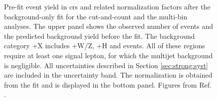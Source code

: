 \begin{figure}[htbp]
	\centering
	\caption{Pre-fit event yield in \glspl{cr} and related \ttbar
          normalization factors after the background-only fit for
		the cut-and-count and  the multi-bin analyses. The upper panel shows 
		the observed number of events and the predicted background yield before the fit.
		The background category \ttbar+X includes \ttbar+W/Z, \ttbar+H and \ttbar\ttbar events. All of these
                regions require at least one signal lepton, for which the
                multijet background is negligible. All uncertainties described in Section \ref{sec:strong:syst} are included in the uncertainty band.
		The \ttbar normalization is obtained from the fit
                and is displayed in the bottom panel.  Figures from Ref. \cite{Aaboud:2017hrg}.
	} 
	\label{fig:pullCR}
\end{figure}

